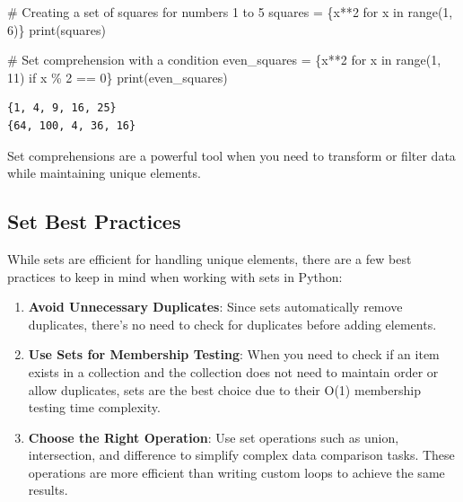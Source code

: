 \documentclass[
  letterpaper,
  DIV=11,
  numbers=noendperiod]{scrreprt}
\newenvironment{Shaded}{\begin{snugshade}}{\end{snugshade}}
\newcommand{\BuiltInTok}[1]{\textcolor[rgb]{0.00,0.23,0.31}{#1}}
\newcommand{\CommentTok}[1]{\textcolor[rgb]{0.37,0.37,0.37}{#1}}
\newcommand{\ControlFlowTok}[1]{\textcolor[rgb]{0.00,0.23,0.31}{#1}}
\newcommand{\DecValTok}[1]{\textcolor[rgb]{0.68,0.00,0.00}{#1}}
\newcommand{\KeywordTok}[1]{\textcolor[rgb]{0.00,0.23,0.31}{#1}}
\newcommand{\NormalTok}[1]{\textcolor[rgb]{0.00,0.23,0.31}{#1}}
\newcommand{\OperatorTok}[1]{\textcolor[rgb]{0.37,0.37,0.37}{#1}}
\begin{document}
\begin{Shaded}
\begin{Highlighting}[]
\CommentTok{\# Creating a set of squares for numbers 1 to 5}
\NormalTok{squares }\OperatorTok{=}\NormalTok{ \{x}\OperatorTok{**}\DecValTok{2} \ControlFlowTok{for}\NormalTok{ x }\KeywordTok{in} \BuiltInTok{range}\NormalTok{(}\DecValTok{1}\NormalTok{, }\DecValTok{6}\NormalTok{)\}}
\BuiltInTok{print}\NormalTok{(squares)  }

\CommentTok{\# Set comprehension with a condition}
\NormalTok{even\_squares }\OperatorTok{=}\NormalTok{ \{x}\OperatorTok{**}\DecValTok{2} \ControlFlowTok{for}\NormalTok{ x }\KeywordTok{in} \BuiltInTok{range}\NormalTok{(}\DecValTok{1}\NormalTok{, }\DecValTok{11}\NormalTok{) }\ControlFlowTok{if}\NormalTok{ x }\OperatorTok{\%} \DecValTok{2} \OperatorTok{==} \DecValTok{0}\NormalTok{\}}
\BuiltInTok{print}\NormalTok{(even\_squares)  }
\end{Highlighting}
\end{Shaded}

\begin{verbatim}
{1, 4, 9, 16, 25}
{64, 100, 4, 36, 16}
\end{verbatim}

Set comprehensions are a powerful tool when you need to transform or
filter data while maintaining unique elements.

\hypertarget{set-best-practices}{%
\subsection{Set Best Practices}\label{set-best-practices}}

While sets are efficient for handling unique elements, there are a few
best practices to keep in mind when working with sets in Python:

\begin{enumerate}
\def\labelenumi{\arabic{enumi}.}
\item
  \textbf{Avoid Unnecessary Duplicates}: Since sets automatically remove
  duplicates, there's no need to check for duplicates before adding
  elements.
\item
  \textbf{Use Sets for Membership Testing}: When you need to check if an
  item exists in a collection and the collection does not need to
  maintain order or allow duplicates, sets are the best choice due to
  their O(1) membership testing time complexity.
\item
  \textbf{Choose the Right Operation}: Use set operations such as union,
  intersection, and difference to simplify complex data comparison
  tasks. These operations are more efficient than writing custom loops
  to achieve the same results.
\end{enumerate}
\end{document}
